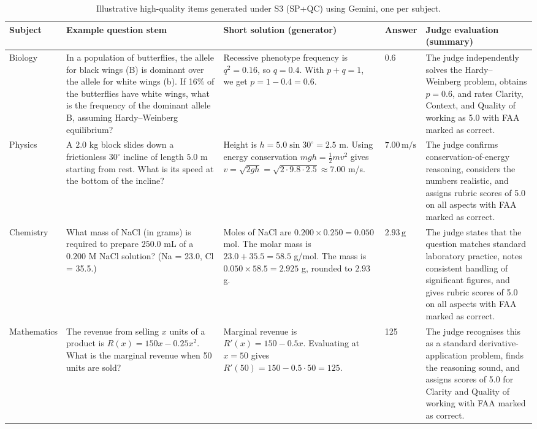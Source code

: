 \documentclass[a4paper,conference]{IEEEtran}
\begin{document}
\begin{table}[!t]
\centering
\small
\caption{Illustrative high-quality items generated under S3 (SP+QC) using Gemini, one per subject.}
\label{tab:example-items-s3}
\begin{tabular}{|p{1.3cm}|p{4.1cm}|p{4.2cm}|p{1.8cm}|p{4.1cm}|}
\hline
\textbf{Subject} & \textbf{Example question stem} & \textbf{Short solution (generator)} & \textbf{Answer} & \textbf{Judge evaluation (summary)} \\ \hline
Biology &
In a population of butterflies, the allele for black wings (B) is dominant over the allele for white wings (b). If 16\% of the butterflies have white wings, what is the frequency of the dominant allele B, assuming Hardy--Weinberg equilibrium? &
Recessive phenotype frequency is \(q^2 = 0.16\), so \(q = 0.4\). With \(p + q = 1\), we get \(p = 1 - 0.4 = 0.6\). &
0.6 &
The judge independently solves the Hardy--Weinberg problem, obtains \(p = 0.6\), and rates Clarity, Context, and Quality of working as 5.0 with FAA marked as correct. \\ \hline
Physics &
A \(2.0\) kg block slides down a frictionless \(30^{\circ}\) incline of length \(5.0\) m starting from rest. What is its speed at the bottom of the incline? &
Height is \(h = 5.0 \sin 30^{\circ} = 2.5\) m. Using energy conservation \(mgh = \tfrac{1}{2}mv^2\) gives \(v = \sqrt{2gh} = \sqrt{2 \cdot 9.8 \cdot 2.5} \approx 7.00\) m/s. &
\(7.00\,\text{m/s}\) &
The judge confirms conservation-of-energy reasoning, considers the numbers realistic, and assigns rubric scores of 5.0 on all aspects with FAA marked as correct. \\ \hline
Chemistry &
What mass of NaCl (in grams) is required to prepare \(250.0\) mL of a \(0.200\) M NaCl solution? (Na = 23.0, Cl = 35.5.) &
Moles of NaCl are \(0.200 \times 0.250 = 0.050\) mol. The molar mass is \(23.0 + 35.5 = 58.5\) g/mol. The mass is \(0.050 \times 58.5 = 2.925\) g, rounded to \(2.93\) g. &
\(2.93\,\text{g}\) &
The judge states that the question matches standard laboratory practice, notes consistent handling of significant figures, and gives rubric scores of 5.0 on all aspects with FAA marked as correct. \\ \hline
Mathematics &
The revenue from selling \(x\) units of a product is \(R(x) = 150x - 0.25x^2\). What is the marginal revenue when 50 units are sold? &
Marginal revenue is \(R'(x) = 150 - 0.5x\). Evaluating at \(x = 50\) gives \(R'(50) = 150 - 0.5 \cdot 50 = 125\). &
125 &
The judge recognises this as a standard derivative-application problem, finds the reasoning sound, and assigns scores of 5.0 for Clarity and Quality of working with FAA marked as correct. \\ \hline
\end{tabular}
\normalsize
\end{table}
\end{document}
